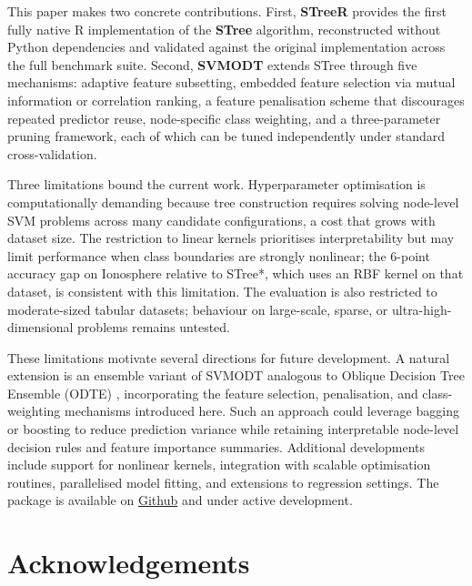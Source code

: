 This paper makes two concrete contributions. First, \textbf{STreeR} provides the first fully native R implementation of the \textbf{STree} algorithm, reconstructed without Python dependencies and validated against the original implementation across the full benchmark suite. Second, \textbf{SVMODT} extends STree through five mechanisms: adaptive feature subsetting, embedded feature selection via mutual information or correlation ranking, a feature penalisation scheme that discourages repeated predictor reuse, node-specific class weighting, and a three-parameter pruning framework, each of which can be tuned independently under standard cross-validation.

Three limitations bound the current work. Hyperparameter optimisation is computationally demanding because tree construction requires solving node-level SVM problems across many candidate configurations, a cost that grows with dataset size. The restriction to linear kernels prioritises interpretability but may limit performance when class boundaries are strongly nonlinear; the 6-point accuracy gap on Ionosphere relative to STree*, which uses an RBF kernel on that dataset, is consistent with this limitation. The evaluation is also restricted to moderate-sized tabular datasets; behaviour on large-scale, sparse, or ultra-high-dimensional problems remains untested.

These limitations motivate several directions for future development. A natural extension is an ensemble variant of SVMODT analogous to Oblique Decision Tree Ensemble (ODTE) \citep{montanana2025}, incorporating the feature selection, penalisation, and class-weighting mechanisms introduced here. Such an approach could leverage bagging or boosting to reduce prediction variance while retaining interpretable node-level decision rules and feature importance summaries. Additional developments include support for nonlinear kernels, integration with scalable optimisation routines, parallelised model fitting, and extensions to regression settings. The package is available on \href{https://github.com/AneeshAgarwala/project-svodt}{Github} and under active development.

\section{Acknowledgements}\label{acknowledgements}

